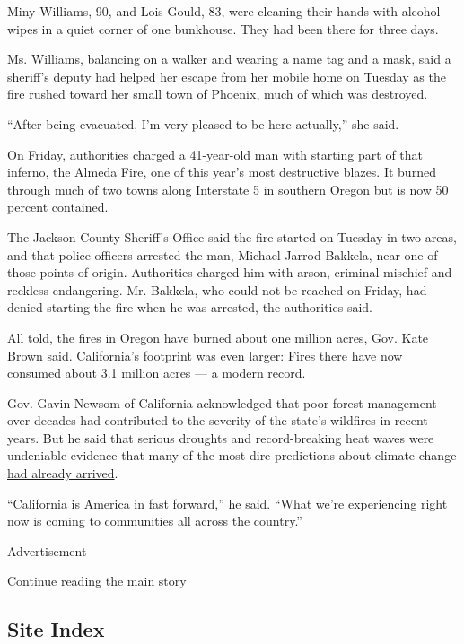 Miny Williams, 90, and Lois Gould, 83, were cleaning their hands with
alcohol wipes in a quiet corner of one bunkhouse. They had been there
for three days.

Ms. Williams, balancing on a walker and wearing a name tag and a mask,
said a sheriff's deputy had helped her escape from her mobile home on
Tuesday as the fire rushed toward her small town of Phoenix, much of
which was destroyed.

``After being evacuated, I'm very pleased to be here actually,'' she
said.

On Friday, authorities charged a 41-year-old man with starting part of
that inferno, the Almeda Fire, one of this year's most destructive
blazes. It burned through much of two towns along Interstate 5 in
southern Oregon but is now 50 percent contained.

The Jackson County Sheriff's Office said the fire started on Tuesday in
two areas, and that police officers arrested the man, Michael Jarrod
Bakkela, near one of those points of origin. Authorities charged him
with arson, criminal mischief and reckless endangering. Mr. Bakkela, who
could not be reached on Friday, had denied starting the fire when he was
arrested, the authorities said.

All told, the fires in Oregon have burned about one million acres, Gov.
Kate Brown said. California's footprint was even larger: Fires there
have now consumed about 3.1 million acres --- a modern record.

Gov. Gavin Newsom of California acknowledged that poor forest management
over decades had contributed to the severity of the state's wildfires in
recent years. But he said that serious droughts and record-breaking heat
waves were undeniable evidence that many of the most dire predictions
about climate change
\href{https://www.nytimes3xbfgragh.onion/2020/09/10/us/climate-change-california-wildfires.html}{had
already arrived}.

``California is America in fast forward,'' he said. ``What we're
experiencing right now is coming to communities all across the
country.''

Advertisement

\protect\hyperlink{after-bottom}{Continue reading the main story}

\hypertarget{site-index}{%
\subsection{Site Index}\label{site-index}}

